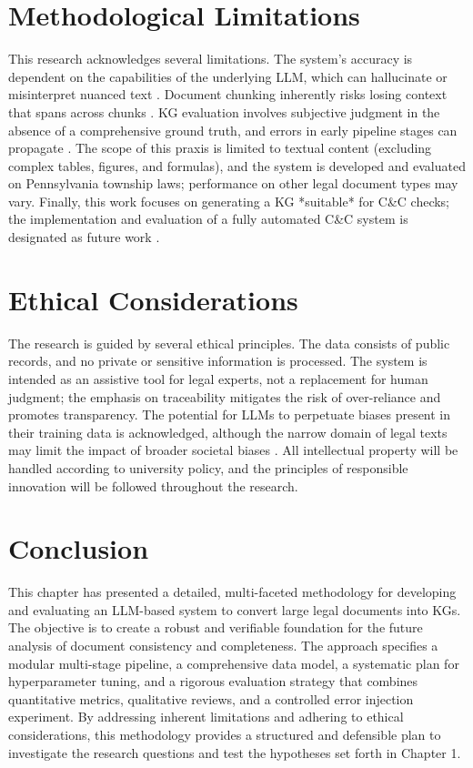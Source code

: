 \section{Methodological Limitations}
This research acknowledges several limitations. The system's accuracy is dependent on the capabilities of the underlying LLM, which can hallucinate or misinterpret nuanced text \parencite{RefWorks:RefID:101-zhao2023survey}. Document chunking inherently risks losing context that spans across chunks \parencite{RefWorks:RefID:104-qu2024semantic}. KG evaluation involves subjective judgment in the absence of a comprehensive ground truth, and errors in early pipeline stages can propagate \parencite{RefWorks:RefID:121-zhong2024comprehensive}. The scope of this praxis is limited to textual content (excluding complex tables, figures, and formulas), and the system is developed and evaluated on Pennsylvania township laws; performance on other legal document types may vary. Finally, this work focuses on generating a KG *suitable* for C\&C checks; the implementation and evaluation of a fully automated C\&C system is designated as future work \parencite{RefWorks:RefID:10-zowghi2003interplay}.

\section{Ethical Considerations}
The research is guided by several ethical principles. The data consists of public records, and no private or sensitive information is processed. The system is intended as an assistive tool for legal experts, not a replacement for human judgment; the emphasis on traceability mitigates the risk of over-reliance and promotes transparency. The potential for LLMs to perpetuate biases present in their training data is acknowledged, although the narrow domain of legal texts may limit the impact of broader societal biases \parencite{RefWorks:RefID:101-zhao2023survey}. All intellectual property will be handled according to university policy, and the principles of responsible innovation will be followed throughout the research.

\section{Conclusion}
This chapter has presented a detailed, multi-faceted methodology for developing and evaluating an LLM-based system to convert large legal documents into KGs. The objective is to create a robust and verifiable foundation for the future analysis of document consistency and completeness. The approach specifies a modular multi-stage pipeline, a comprehensive data model, a systematic plan for hyperparameter tuning, and a rigorous evaluation strategy that combines quantitative metrics, qualitative reviews, and a controlled error injection experiment. By addressing inherent limitations and adhering to ethical considerations, this methodology provides a structured and defensible plan to investigate the research questions and test the hypotheses set forth in Chapter 1.

